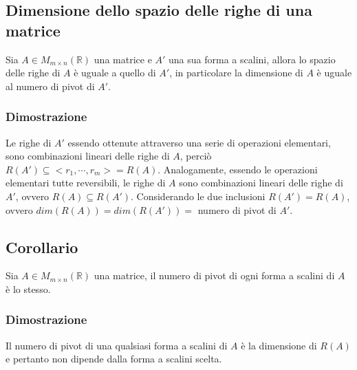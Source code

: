 \subsection{Dimensione dello spazio delle righe di una matrice}
Sia $A\in M_{m\times n}(\mathbb{R})$ una matrice e $A'$ una sua forma a scalini, allora lo spazio delle righe di $A$ \`e uguale a quello di $A'$, in particolare la dimensione di 
$A$ \`e uguale al numero di pivot di $A'$.
\subsubsection{Dimostrazione}
Le righe di $A'$ essendo ottenute attraverso una serie di operazioni elementari, sono combinazioni lineari delle righe di $A$, perci\`o $R(A')\subseteq<r_1,\cdots,r_m> =R(A)$. 
Analogamente, essendo le operazioni elementari tutte reversibili, le righe di $A$ sono combinazioni lineari delle righe di $A'$, ovvero $R(A)\subseteq R(A')$. Considerando le due 
inclusioni $R(A')=R(A)$, ovvero $dim(R(A))=dim(R(A'))=$ numero di pivot di $A'$.
\subsection{Corollario}
Sia $A\in M_{m\times n}(\mathbb{R})$ una matrice, il numero di pivot di ogni forma a scalini di $A$ \`e lo stesso.
\subsubsection{Dimostrazione}
Il numero di pivot di una qualsiasi forma a scalini di $A$ \`e la dimensione di $R(A)$ e pertanto non dipende dalla forma a scalini scelta.





